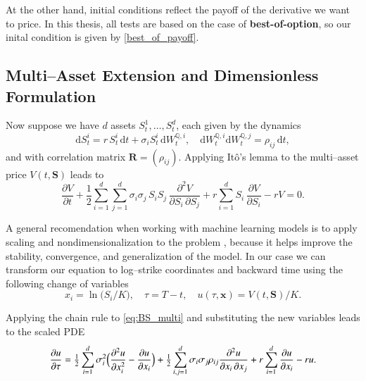 \documentclass[12pt]{report} %
\theoremstyle{plain}           %
\theoremstyle{definition}      %
\theoremstyle{remark}          %
\begin{document}
At the other hand, initial conditions reflect the payoff of the derivative we want to price. 
In this thesis, all tests are based on the case of \textbf{best-of-option}, so our inital condition 
is given by
\eqref{best_of_payoff}.


\subsection{Multi–Asset Extension and Dimensionless Formulation}
Now suppose we have $d$ assets $S_t^1,\dots,S_t^d$, each given by the dynamics
\begin{equation}
  \mathrm{d}S_t^i = r\,S_t^i\,\mathrm{d}t + \sigma_i S_t^i\,\mathrm{d}W_t^{\mathbb{Q},i},
  \quad
  \mathrm{d}W_t^{\mathbb{Q},i}\mathrm{d}W_t^{\mathbb{Q},j}=\rho_{ij}\,\mathrm{d}t,
  \label{eq:gbm_multi}
\end{equation}
and with correlation matrix $\mathbf{R}=(\rho_{ij})$. Applying Itô’s lemma to the multi–asset price $V(t,\mathbf{S})$ leads to
\begin{equation}
  \frac{\partial V}{\partial t}
  + \frac{1}{2}\sum_{i=1}^d\sum_{j=1}^d
    \sigma_i\sigma_j\,S_iS_j\,\frac{\partial^2 V}{\partial S_i\,\partial S_j}
  + r\sum_{i=1}^d S_i\,\frac{\partial V}{\partial S_i} - rV = 0.
  \label{eq:BS_multi}
\end{equation}

A general recomendation when working with machine learning models is to apply scaling and nondimensionalization to the problem \cite{wang2023expertsguidetrainingphysicsinformed},
because it helps improve the stability, convergence, and generalization of the model. In our case we can transform our equation to 
log–strike coordinates and backward time using the following change of variables
\begin{equation}
  x_i=\ln\bigl(S_i/K\bigr),
  \quad
  \tau=T-t,
  \quad
  u(\tau,\mathbf{x})=V(t,\mathbf{S})/K.
\end{equation}

Applying the chain rule to \eqref{eq:BS_multi} and substituting the new variables leads to the scaled PDE
\begin{equation}
  \frac{\partial u}{\partial \tau} =
    \tfrac12\sum_{i=1}^d \sigma_i^2
      \Bigl(\frac{\partial^2 u}{\partial x_i^2}-\frac{\partial u}{\partial x_i}\Bigr)
    + \tfrac12\sum_{i,j=1}^d \sigma_i\sigma_j\rho_{ij}
      \frac{\partial^2 u}{\partial x_i\,\partial x_j}
    + r\sum_{i=1}^d \frac{\partial u}{\partial x_i}
    - ru.
  \label{eq:scaled_PDE}
\end{equation}
\end{document}
